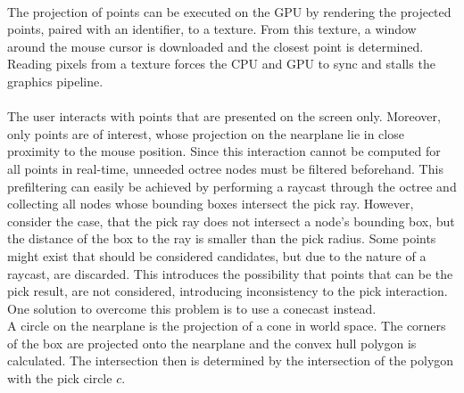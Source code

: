 \\
The projection of points can be executed on the GPU by rendering the projected points, paired with an identifier, to a texture. From this texture, a window around the mouse cursor is downloaded and the closest point is determined. Reading pixels from a texture forces the CPU and GPU to sync and stalls the graphics pipeline. 
\\
\\
The user interacts with points that are presented on the screen only. Moreover, only points are of interest, whose projection on the nearplane lie in close proximity to the mouse position. Since this interaction cannot be computed for all points in real-time, unneeded octree nodes must be filtered beforehand. This prefiltering can easily be achieved by performing a raycast through the octree and collecting all nodes whose bounding boxes intersect the pick ray. However, consider the case, that the pick ray does not intersect a node's bounding box, but the distance of the box to the ray is smaller than the pick radius. Some points might exist that should be considered candidates, but due to the nature of a raycast, are discarded. This introduces the possibility that points that can be the pick result, are not considered, introducing inconsistency to the pick interaction. One solution to overcome this problem is to use a conecast instead. 
\\
A circle on the nearplane is the projection of a cone in world space. The corners of the box are projected onto the nearplane and the convex hull polygon is calculated. The intersection then is determined by the intersection of the polygon with the pick circle $c$. 







